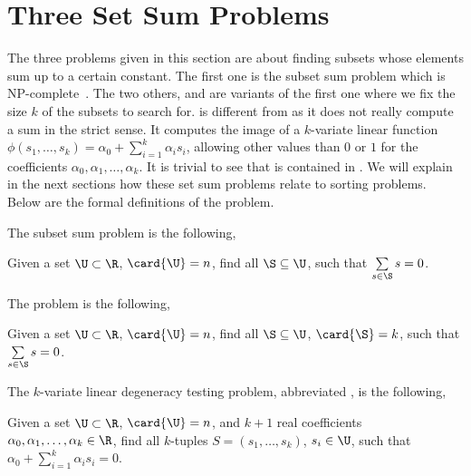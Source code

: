 
\section{Three Set Sum Problems}

The three problems given in this section are about finding subsets whose
elements sum up to a certain constant. The first one is the subset sum problem
which is NP-complete~\cite{karp:1972}. The two others, \kSUM and \kLDT are variants of the
first one where we fix the size $k$ of the subsets to search for. \kLDT is
different from \kSUM as it does not really compute a sum in the strict sense.
It computes the image of a $k$-variate linear function $\phi(s_1, \ldots, s_k)
= \alpha_0 + \sum_{i=1}^{k} \alpha_i s_i$, allowing other values than $0$ or
$1$ for the coefficients $\alpha_0, \alpha_1, \ldots, \alpha_k$. It is trivial
to see that \kSUM is contained in \kLDT. We will explain in the next sections
how these set sum problems relate to sorting problems. Below are the formal
definitions of the problem.

The subset sum problem is the following,

\begin{problem}
Given a set $\U \subset \R$, $\card{\U} = n$, find all
$\S \subseteq \U$, such that $\sum\limits_{s \in \S} s = 0$.
\end{problem}


The \kSUM problem is the following,

\begin{problem}
Given a set $\U \subset \R$, $\card{\U} = n$, find all
$\S \subseteq \U$, $\card{\S} = k$, such that $\sum\limits_{s
\in \S} s = 0$.
\end{problem}


The $k$-variate linear degeneracy testing problem, abbreviated \kLDT, is the
following,

\begin{problem}
Given a set $\U \subset \R$, $\card{\U} = n$, and $k+1$ real
coefficients $\alpha_0, \alpha_1, \ldots, \alpha_k \in \R$, find all $k$-tuples
$S = (s_1, \ldots, s_k)$, $s_i \in \U$, such that
$\alpha_0 + \sum_{i=1}^{k} \alpha_i s_i = 0$.
\end{problem}
